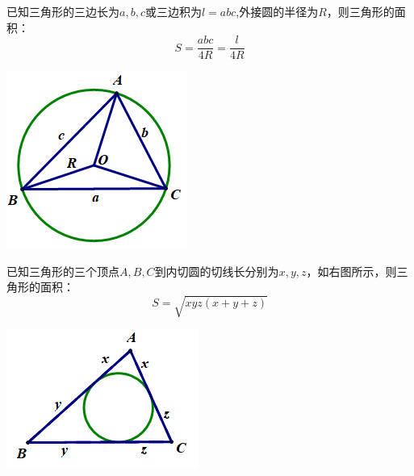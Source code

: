 \documentclass[10pt]{ctexart}
\begin{document}
\begin{minipage}[t]{0.7\textwidth}
\begin{dkyi}{}{}
已知三角形的三边长为$a,b,c$或三边积为$l=abc$,外接圆的半径为$R$，则三角形的面积：
\[S=\dfrac{abc}{4R}=\dfrac{l}{4R}\]
\end{dkyi}
\end{minipage}
\begin{minipage}[t]{0.3\textwidth}
\qquad\includegraphics[scale=0.5]{figure/mj-06.png}
\end{minipage}

\begin{minipage}[t]{0.7\textwidth}
\begin{dkyi}{}{}
已知三角形的三个顶点$A,B,C$到内切圆的切线长分别为$x,y,z$，如右图所示，则三角形的面积：
\[S=\sqrt{xyz(x+y+z)}\]
\end{dkyi}
\end{minipage}
\begin{minipage}[t]{0.3\textwidth}
\includegraphics[scale=0.6]{figure/mj-07.png}
\end{minipage}
\end{document}
